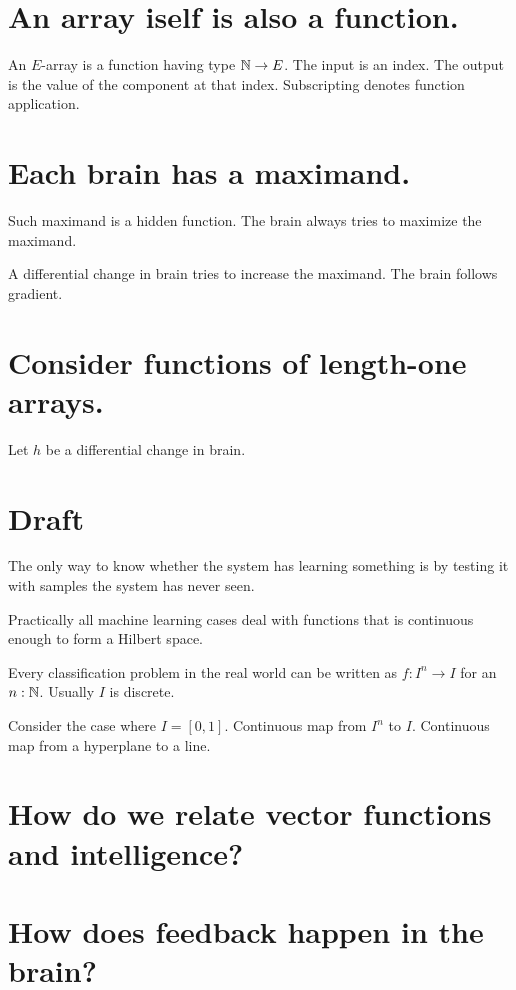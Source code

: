 \section{An array iself is also a function.}

An \(E\)-array is a function having type \(\mathbb{N} \to E\).
The input is an index.
The output is the value of the component at that index.
Subscripting denotes function application.

\section{Each brain has a maximand.}

Such maximand is a hidden function.
The brain always tries to maximize the maximand.

A differential change in brain tries to increase the maximand.
The brain follows gradient.

\section{Consider functions of length-one arrays.}

Let \(h\) be a differential change in brain.

\section{Draft}

The only way to know whether the system has learning something
is by testing it with samples the system has never seen.

Practically all machine learning cases deal with functions
that is continuous enough to form a Hilbert space.

Every classification problem in the real world can be written as \(f : I^n \to I\) for an \(n : \mathbb{N}\).
Usually \(I\) is discrete.

Consider the case where \(I = [0,1]\).
Continuous map from \(I^n\) to \(I\).
Continuous map from a hyperplane to a line.

\section{How do we relate vector functions and intelligence?}

\section{How does feedback happen in the brain?}

